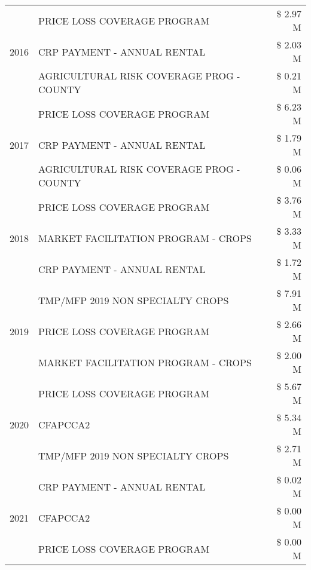 \begin{tabular}{llr}
\cline{1-3}
\multirow[t]{3}{*}{2016} & PRICE LOSS COVERAGE PROGRAM & \$ 2.97 M \\
 & CRP PAYMENT - ANNUAL RENTAL & \$ 2.03 M \\
 & AGRICULTURAL RISK COVERAGE PROG - COUNTY & \$ 0.21 M \\
\cline{1-3}
\multirow[t]{3}{*}{2017} & PRICE LOSS COVERAGE PROGRAM & \$ 6.23 M \\
 & CRP PAYMENT - ANNUAL RENTAL & \$ 1.79 M \\
 & AGRICULTURAL RISK COVERAGE PROG - COUNTY & \$ 0.06 M \\
\cline{1-3}
\multirow[t]{3}{*}{2018} & PRICE LOSS COVERAGE PROGRAM & \$ 3.76 M \\
 & MARKET FACILITATION PROGRAM - CROPS & \$ 3.33 M \\
 & CRP PAYMENT - ANNUAL RENTAL & \$ 1.72 M \\
\cline{1-3}
\multirow[t]{3}{*}{2019} & TMP/MFP 2019 NON SPECIALTY CROPS & \$ 7.91 M \\
 & PRICE LOSS COVERAGE PROGRAM & \$ 2.66 M \\
 & MARKET FACILITATION PROGRAM - CROPS & \$ 2.00 M \\
\cline{1-3}
\multirow[t]{3}{*}{2020} & PRICE LOSS COVERAGE PROGRAM & \$ 5.67 M \\
 & CFAPCCA2 & \$ 5.34 M \\
 & TMP/MFP 2019 NON SPECIALTY CROPS & \$ 2.71 M \\
\cline{1-3}
\multirow[t]{3}{*}{2021} & CRP PAYMENT - ANNUAL RENTAL & \$ 0.02 M \\
 & CFAPCCA2 & \$ 0.00 M \\
 & PRICE LOSS COVERAGE PROGRAM & \$ 0.00 M \\
\cline{1-3}
\bottomrule
\end{tabular}
